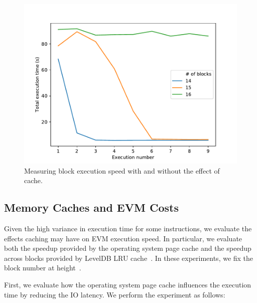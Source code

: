 \begin{figure}[tb]
  \includegraphics[width=\columnwidth]{3-vm-security/figures/cache-persistence.pdf}
  \caption{Measuring block execution speed with and without the effect of cache.}
  \label{fig:cache-persistence}
\end{figure}

\subsection{Memory Caches and EVM Costs}
\label{ssec:memory-caches}
Given the high variance in execution time for some instructions, we evaluate the effects caching may have on EVM execution speed. In particular, we evaluate both the speedup provided by the operating system page cache and the speedup across blocks provided by LevelDB LRU cache~\cite{leveldb-cache}. In these experiments, we fix the block number at height~.

 First, we evaluate how the operating system page cache influences the execution time by reducing the IO latency. We perform the experiment as follows:

